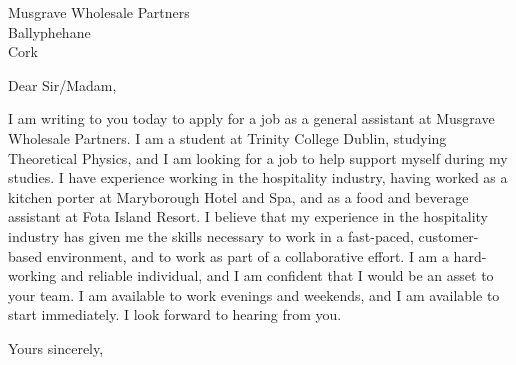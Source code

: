 \documentclass{letter}
\begin{document}
\begin{letter}{Musgrave Wholesale Partners\\Ballyphehane\\Cork}

\opening{Dear Sir/Madam,}
I am writing to you today to apply for a job as a general assistant at Musgrave Wholesale Partners. I am a student at Trinity College Dublin, studying Theoretical Physics, and I am looking for a job to help support myself during my studies. I have experience working in the hospitality industry, having worked as a kitchen porter at Maryborough Hotel and Spa, and as a food and beverage assistant at Fota Island Resort. I believe that my experience in the hospitality industry has given me the skills necessary to work in a fast-paced, customer-based environment, and to work as part of a collaborative effort. I am a hard-working and reliable individual, and I am confident that I would be an asset to your team. I am available to work evenings and weekends, and I am available to start immediately. I look forward to hearing from you.\\
\closing{Yours sincerely,}

\end{letter}
\end{document}
